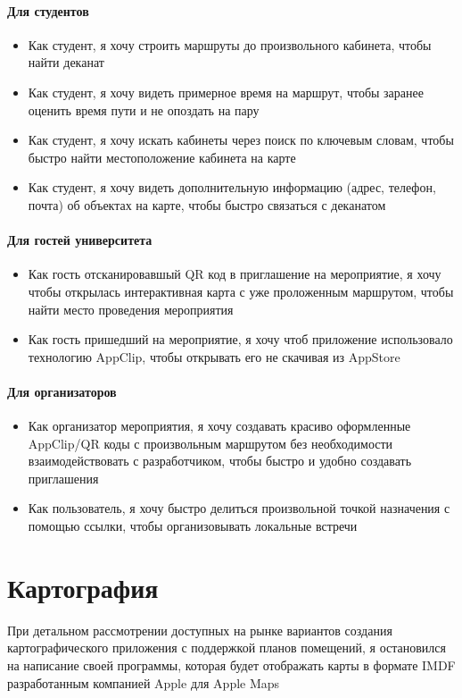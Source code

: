     \subsubsection{Для студентов}
      \begin{itemize}
        \item Как студент, я хочу строить маршруты до произвольного кабинета, чтобы найти деканат
        \item Как студент, я хочу видеть примерное время на маршрут, чтобы заранее оценить время пути и не опоздать на пару
        \item Как студент, я хочу искать кабинеты через поиск по ключевым словам, чтобы быстро найти местоположение кабинета на карте
        \item Как студент, я хочу видеть дополнительную информацию (адрес, телефон, почта) об объектах на карте, чтобы быстро связаться с деканатом
      \end{itemize}
    \subsubsection{Для гостей университета}
      \begin{itemize}
        \item Как гость отсканировавшый QR код в приглашение на мероприятие, я хочу чтобы открылась интерактивная карта с уже проложенным маршрутом, чтобы найти место проведения мероприятия
        \item Как гость пришедший на мероприятие, я хочу чтоб приложение использовало технологию AppClip, чтобы открывать его не скачивая из AppStore
      \end{itemize}
    \subsubsection{Для организаторов}
      \begin{itemize}
        \item Как организатор мероприятия, я хочу создавать красиво оформленные AppClip/QR коды с произвольным маршрутом без необходимости взаимодействовать с разработчиком, чтобы быстро и удобно создавать приглашения
        \item Как пользователь, я хочу быстро делиться произвольной точкой назначения с помощью ссылки, чтобы организовывать локальные встречи
      \end{itemize}



\chapter{Картография}
  При детальном рассмотрении доступных на рынке вариантов создания картографического приложения с поддержкой планов помещений, я остановился на написание своей программы, которая будет отображать карты в формате IMDF разработанным компанией Apple для Apple Maps

